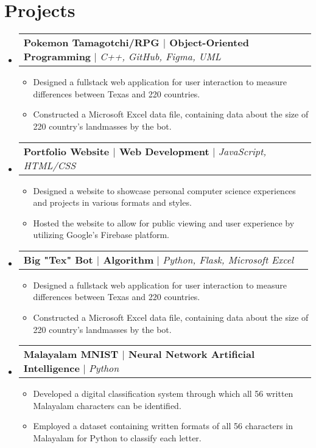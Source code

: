 \documentclass[letterpaper,11pt]{article}
\makeatletter
\newcommand{\resumeItem}[1]{
  \item\small{
    {#1 \vspace{-2pt}}
  }
}
\newcommand{\resumeSubSubheading}[2]{
    \item
    \begin{tabular*}{0.97\textwidth}{l@{\extracolsep{\fill}}r}
      \textit{\small#1} & \textit{\small #2} \\
    \end{tabular*}\vspace{-7pt}
}
\newcommand{\resumeProjectHeading}[2]{
    \item
    \begin{tabular*}{0.97\textwidth}{l@{\extracolsep{\fill}}r}
      \small#1 & #2 \\
    \end{tabular*}\vspace{-7pt}
}
\newcommand{\resumeSubHeadingListStart}{\begin{itemize}[leftmargin=0.15in, label={}]}
\newcommand{\resumeSubHeadingListEnd}{\end{itemize}}
\newcommand{\resumeItemListStart}{\begin{itemize}}
\newcommand{\resumeItemListEnd}{\end{itemize}\vspace{-5pt}}
\makeatother
\begin{document}

\section{Projects}
    \resumeSubHeadingListStart
    \resumeProjectHeading
          {\textbf{Pokemon Tamagotchi/RPG $|$ Object-Oriented Programming } $|$ \emph{C++, GitHub, Figma, UML}}{}
          \resumeItemListStart
            \resumeItem{Designed a fullstack web application for user interaction to measure differences between Texas and 220 countries.}
            \resumeItem{ Constructed a Microsoft Excel data file, containing data about the size of 220 country’s landmasses by the bot.}
          \resumeItemListEnd

          \resumeProjectHeading
          {\textbf{Portfolio Website $|$ Web Development} $|$ \emph{JavaScript, HTML/CSS}}{}
          \resumeItemListStart
            \resumeItem{Designed a website to showcase personal computer science experiences and projects in various formats and styles.}
            \resumeItem{Hosted the website to allow for public viewing and user experience by utilizing Google's Firebase platform.}
          \resumeItemListEnd
          
      \resumeProjectHeading
          {\textbf{Big "Tex" Bot $|$ Algorithm } $|$ \emph{Python, Flask, Microsoft Excel}}{}
          \resumeItemListStart
            \resumeItem{Designed a fullstack web application for user interaction to measure differences between Texas and 220 countries.}
            \resumeItem{ Constructed a Microsoft Excel data file, containing data about the size of 220 country’s landmasses by the bot.}
          \resumeItemListEnd
          
      \resumeProjectHeading
          {\textbf{Malayalam MNIST $|$ Neural Network Artificial Intelligence} $|$ \emph{Python}}{}
          \resumeItemListStart
            \resumeItem{Developed a digital classification system through which all 56 written Malayalam characters can be identified.}
            \resumeItem{Employed a dataset containing written formats of all 56 characters in Malayalam for Python to classify each letter.}
          \resumeItemListEnd
    \resumeSubHeadingListEnd
\end{document}
